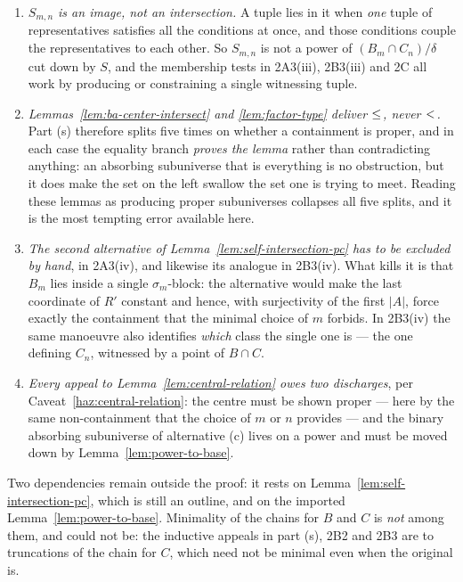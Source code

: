 \begin{hazard}\label{haz:intersection-draft}
\begin{enumerate}\alphlabels\tightlist
\item \emph{$S_{m,n}$ is an image, not an intersection.} A tuple lies in it
  when \emph{one} tuple of representatives satisfies all the conditions at
  once, and those conditions couple the representatives to each other. So
  $S_{m,n}$ is not a power of $(B_{m}\cap C_{n})/\delta$ cut down by $S$, and
  the membership tests in 2A3(iii), 2B3(iii) and 2C all work by producing or
  constraining a single witnessing tuple.
\item \emph{Lemmas~\ref{lem:ba-center-intersect} and \ref{lem:factor-type}
  deliver $\le_{}^{}$, never $<_{}^{}$.} Part (s) therefore splits five times on
  whether a containment is proper, and in each case the equality branch
  \emph{proves the lemma} rather than contradicting anything: an absorbing
  subuniverse that is everything is no obstruction, but it does make the set on
  the left swallow the set one is trying to meet. Reading these lemmas as
  producing proper subuniverses collapses all five splits, and it is the most
  tempting error available here.
\item \emph{The second alternative of Lemma~\ref{lem:self-intersection-pc} has
  to be excluded by hand}, in 2A3(iv), and likewise its analogue in 2B3(iv).
  What kills it is that $B_{m}$ lies inside a single $\sigma_{m}$-block: the
  alternative would make the last coordinate of $R'$ constant and hence, with
  surjectivity of the first $|A|$, force exactly the containment that the
  minimal choice of $m$ forbids. In 2B3(iv) the same manoeuvre also identifies
  \emph{which} class the single one is --- the one defining $C_{n}$, witnessed
  by a point of $B\cap C$.
\item \emph{Every appeal to Lemma~\ref{lem:central-relation} owes two
  discharges}, per Caveat~\ref{haz:central-relation}: the centre must be shown
  proper --- here by the same non-containment that the choice of $m$ or $n$
  provides --- and the binary absorbing subuniverse of alternative (c) lives on
  a power and must be moved down by Lemma~\ref{lem:power-to-base}.
\end{enumerate}

Two dependencies remain outside the proof: it rests on
Lemma~\ref{lem:self-intersection-pc}, which is still an outline, and on the
imported Lemma~\ref{lem:power-to-base}. Minimality of the chains for $B$ and
$C$ is \emph{not} among them, and could not be: the inductive appeals in part
(s), 2B2 and 2B3 are to truncations of the chain for $C$, which need not be
minimal even when the original is.
\end{hazard}

